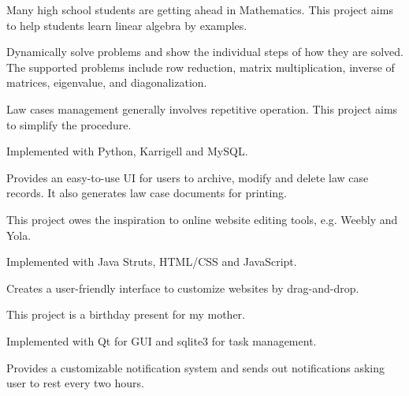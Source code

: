 \documentclass[]{deedy-resume-openfont}
\begin{document}
\begin{minipage}[t]{0.66\textwidth}
\begin{tightemize} 
\item Many high school students are getting ahead in Mathematics. This project aims to help students learn linear algebra by examples. 
\item Dynamically solve problems and show the individual steps of how they are solved. The supported problems include row reduction, matrix multiplication, inverse of matrices, eigenvalue, and diagonalization.
\end{tightemize}
\sectionsep

\begin{tightemize} 
\item Law cases management generally involves repetitive operation. This project aims to simplify the procedure.
\item Implemented with Python, Karrigell and MySQL. 
\item Provides an easy-to-use UI for users to archive, modify and delete law case records. It also generates law case documents for printing.
\end{tightemize}
\sectionsep

\begin{tightemize} 
\item This project owes the inspiration to online website editing tools, e.g. Weebly and Yola. 
\item Implemented with Java Struts, HTML/CSS and JavaScript. 
\item Creates a user-friendly interface to customize websites by drag-and-drop.
\end{tightemize}
\sectionsep

\begin{tightemize} 
\item This project is a birthday present for my mother.
\item Implemented with Qt for GUI and sqlite3 for task management.
\item Provides a customizable notification system and sends out notifications asking user to rest every two hours.
\end{tightemize}
\sectionsep

\end{minipage} 
\end{document}
